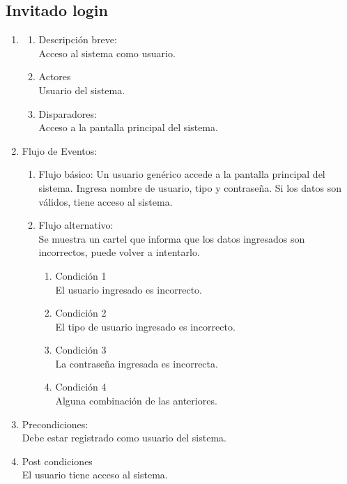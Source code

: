 \documentclass[a4paper,11pt]{article}
\begin{document}
\subsection{Invitado login}
\begin{enumerate}

    \item
        \begin{enumerate}
            \item Descripción breve: \\
                Acceso al sistema como usuario.
            \item Actores \\
                Usuario del sistema.
            \item Disparadores: \\
                Acceso a la pantalla principal del sistema.
        \end{enumerate}

    \item Flujo de Eventos:
        \begin{enumerate}
            \item Flujo básico:
                Un usuario genérico accede a la pantalla principal del sistema.
                Ingresa nombre de usuario, tipo y contraseña. Si los datos son
                válidos, tiene acceso al sistema.

            \item Flujo alternativo:\\
                Se muestra un cartel que informa que los datos ingresados son
                incorrectos, puede volver a intentarlo.

                \begin{enumerate}
                \item Condición 1 \\
                    El usuario ingresado es incorrecto.
                \item Condición 2 \\
                    El tipo de usuario ingresado es incorrecto.
                \item Condición 3 \\
                    La contraseña ingresada es incorrecta.
                \item Condición 4 \\
                    Alguna combinación de las anteriores.
                \end{enumerate}

        \end{enumerate}

        \item Precondiciones: \\
            Debe estar registrado como usuario del sistema.

        \item Post condiciones \\
            El usuario tiene acceso al sistema.

\end{enumerate}
\end{document}
